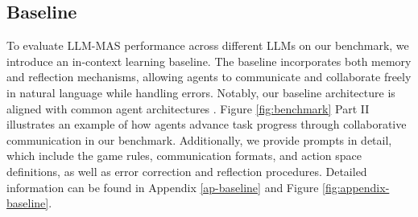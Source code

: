 \documentclass[11pt]{article}
\begin{document}
% 

\subsection{Baseline}
\label{sec-baseline}
To evaluate LLM-MAS performance across different LLMs on our benchmark, we introduce an in-context learning baseline. The baseline incorporates both memory and reflection mechanisms, allowing agents to communicate and collaborate freely in natural language while handling errors. Notably, our baseline architecture is aligned with common agent architectures \cite{dong2024villageragent,zhao2024expel,zhu2025multiagentbench}. Figure \ref{fig:benchmark} Part II illustrates an example of how agents advance task progress through collaborative communication in our benchmark. Additionally, we provide prompts in detail, which include the game rules, communication formats, and action space definitions, as well as error correction and reflection procedures. Detailed information can be found in Appendix \ref{ap-baseline} and Figure \ref{fig:appendix-baseline}.

% 
\end{document}
